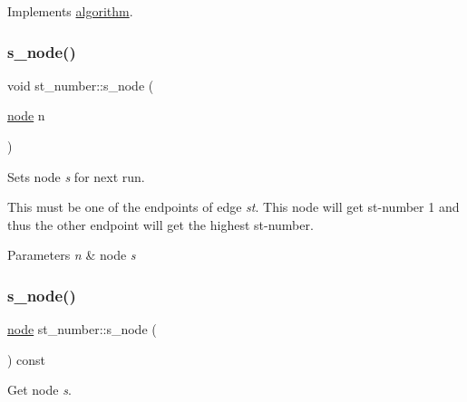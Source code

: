 Implements \mbox{\hyperlink{classalgorithm_a734b189509a8d6b56b65f8ff772d43ca}{algorithm}}.

\mbox{\label{classst__number_aa607c9aaa5a4d9c45e5854ce672f0fda}} 
\subsubsection{\texorpdfstring{s\+\_\+node()}{s\_node()}\hspace{0.1cm}{\footnotesize\ttfamily [1/2]}}
{\footnotesize\ttfamily void st\+\_\+number\+::s\+\_\+node (\begin{DoxyParamCaption}\item[{\mbox{\hyperlink{classnode}{node}}}]{n }\end{DoxyParamCaption})\hspace{0.3cm}{\ttfamily [inline]}}



Sets node {\itshape s} for next run. 

This must be one of the endpoints of edge {\itshape st}. This node will get st-\/number 1 and thus the other endpoint will get the highest st-\/number.


\begin{DoxyParams}{Parameters}
{\em n} & node {\itshape s} \\
\hline
\end{DoxyParams}
\mbox{\label{classst__number_aba061fba83eb63b7a23dd685e1db663c}} 
\subsubsection{\texorpdfstring{s\+\_\+node()}{s\_node()}\hspace{0.1cm}{\footnotesize\ttfamily [2/2]}}
{\footnotesize\ttfamily \mbox{\hyperlink{classnode}{node}} st\+\_\+number\+::s\+\_\+node (\begin{DoxyParamCaption}{ }\end{DoxyParamCaption}) const\hspace{0.3cm}{\ttfamily [inline]}}



Get node {\itshape s}. 


